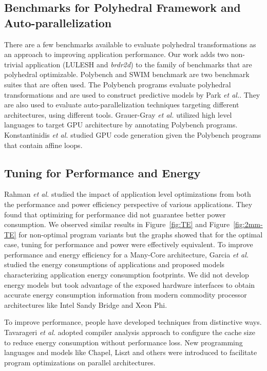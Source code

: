 \subsection{Benchmarks for Polyhedral Framework and Auto-parallelization}
There are a few benchmarks available to evaluate polyhedral transformations as 
an approach to improving application performance.  Our work adds two non-trivial application (LULESH and \emph{brdr2d})
to the family of benchmarks that are polyhedral optimizable. Polybench\cite{Polybench} and 
SWIM\cite{SWIM} benchmark are two benchmark suites that are often used. The Polybench programs evaluate polyhedral 
transformations and are used to construct predictive models by Park {\it et al.}\cite{EJ2011,EJ2012, EJ2013}.
They are also used to evaluate auto-parallelization techniques targeting different architectures,
using different tools. Grauer-Gray {\it et al.}\cite{Scott} utilized high level languages 
to target GPU architecture by annotating Polybench programs. Konstantinidis {\it et al.}\cite{LCPC2013}
studied GPU code generation given the Polybench programs that contain affine loops. 
 
\subsection{Tuning for Performance and Energy}
Rahman {\it et al.}\cite{CF12} studied the impact of application level optimizations from both the 
performance and power efficiency perspective of various applications. They found
that optimizing for performance did not guarantee better power consumption. We 
observed similar results in Figure~\ref{fig:TE} and Figure~\ref{fig:2mm-TE} for non-optimal
program variants but the graphs showed that for the optimal case, tuning for performance and power were 
effectively equivalent. To improve performance and energy efficiency for a Many-Core architecture,
Garcia {\it et al.}\cite{Garcia} studied the energy consumptions of applications and proposed models 
characterizing application energy consumption footprints. We did not
develop energy models but took advantage of the exposed hardware interfaces to obtain accurate   
energy consumption information from modern commodity processor architectures like
Intel Sandy Bridge and Xeon Phi.

To improve performance, people have 
developed techniques from distinctive ways. Tavarageri {\it et al.}\cite{Reduce-Cache} 
adopted compiler analysis approach to configure the cache size to reduce energy consumption
without performance loss. New programming languages\cite{IPDPS13:LULESH} and 
models like Chapel, Liszt and others were introduced to facilitate program optimizations
on parallel architectures.
